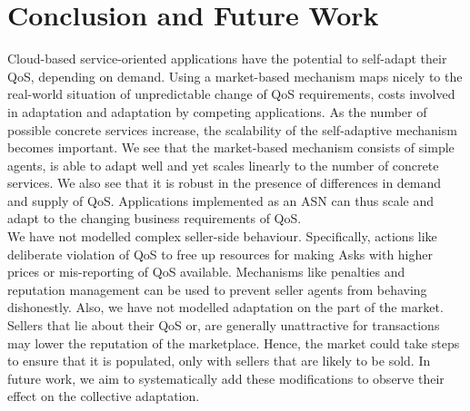 \documentclass[10pt,journal,compsoc]{IEEEtran}
\begin{document}
\section{Conclusion and Future Work}
Cloud-based service-oriented applications have the potential to self-adapt their QoS, depending on demand. Using a market-based mechanism maps nicely to the real-world situation of unpredictable change of QoS requirements, costs involved in adaptation and adaptation by competing applications. As the number of possible concrete services increase, the scalability of the self-adaptive mechanism becomes important. We see that the market-based mechanism consists of simple agents, is able to adapt well and yet scales linearly to the number of concrete services. We also see that it is robust in the presence of differences in demand and supply of QoS. Applications implemented as an ASN can thus scale and adapt to the changing business requirements of QoS.\\
We have not modelled complex seller-side behaviour. Specifically, actions like deliberate violation of QoS to free up resources for making Asks with higher prices or mis-reporting of QoS available. Mechanisms like penalties and reputation management can be used to prevent seller agents from behaving dishonestly. Also, we have not modelled adaptation on the part of the market. Sellers that lie about their QoS or, are generally unattractive for transactions may lower the reputation of the marketplace. Hence, the market could take steps to ensure that it is populated, only with sellers that are likely to be sold. In future work, we aim to systematically add these modifications to observe their effect on the collective adaptation. \\
  
  

\end{document}
